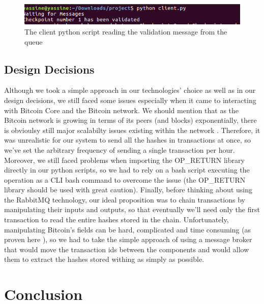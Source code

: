 \begin{figure}[htp]
    \centering
    \includegraphics[scale=0.42]{out}
    \caption{The client python script reading the validation message from the queue}
\end{figure}
\subsection{Design Decisions}
Although we took a simple approach in our technologies' choice as well as in our design decisions, we still faced some issues especially when it came to interacting with Bitcoin Core and the Bitcoin network. We should mention that as the Bitcoin network is growing in terms of its peers (and blocks) exponentially, there is obvioulsy still major scalabilty issues existing within the network \cite{scale}. Therefore, it was unrealistic for our system to send all the hashes in transactions at once, so we've set the arbitrary frequency of sending a single transaction per hour. Moreover, we still faced problems when importing the OP\_RETURN library directly in our python scripts, so we had to rely on a bash script executing the operation as a CLI bash command to overcome the issue (the OP\_RETURN library should be used with great caution). Finally, before thinking about using the RabbitMQ technology, our ideal proposition was to chain transactions by manipulating their inputs and outputs, so that eventually we'll need only the first transaction to read the entire hashes stored in the chain. Unfortunately, manipulating Bitcoin's fields can be hard, complicated and time consuming (as proven here \cite{hard}), so we had to take the simple approach of using a message broker that would move the transaction ids between the components and would allow them to extract the hashes stored withing as simply as possible.
\section{Conclusion}
